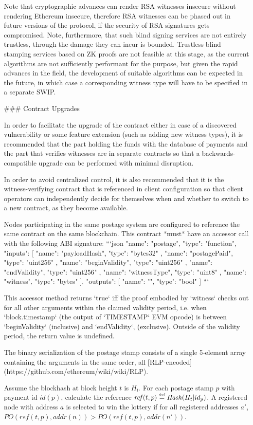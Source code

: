 Note that cryptographic advances can render RSA witnesses insecure without rendering Ethereum insecure, therefore RSA witnesses can be phased out in future versions of the protocol, if the security of RSA signatures gets compromised. Note, furthermore, that such blind signing services are not entirely trustless, through the damage they can incur is bounded. Trustless blind stamping services based on ZK proofs are not feasible at this stage, as the current algorithms are not sufficiently performant for the purpose, but given the rapid advances in the field, the development of suitable algorithms can be expected in the future, in which case a corresponding witness type will have to be specified in a separate SWIP.

### Contract Upgrades

In order to facilitate the upgrade of the contract either in case of a discovered vulnerability or some feature extension (such as adding new witness types), it is recommended that the part holding the funds with the database of payments and the part that verifies witnesses are in separate contracts so that a backwards-compatible upgrade can be performed with minimal disruption.

In order to avoid centralized control, it is also recommended that it is the witness-verifying contract that is referenced in client configuration so that client operators can independently decide for themselves when and whether to switch to a new contract, as they become available.


Nodes participating in the same postage system are configured to reference the same contract on the same blockchain. This contract
*must* have an accessor call with the following ABI signature:
```json
{
  "name": "postage",
  "type": "function",
  "inputs": [
    {
      "name": "payloadHash",
      "type": "bytes32"
    },
    {
      "name": "postagePaid",
      "type": "uint256"
    },
    {
      "name": "beginValidity",
      "type": "uint256"
    },
    {
      "name": "endValidity",
      "type": "uint256"
    },
    {
      "name": "witnessType",
      "type": "uint8"
    },
    {
      "name": "witness",
      "type": "bytes"
    }
  ],
  "outputs": [
    {
      "name": "",
      "type": "bool"
    }
  ]
}
```

This accessor method returns `true` iff the proof embodied by `witness` checks out for all other arguments within the claimed 
validity period, i.e. when `block.timestamp` (the output of `TIMESTAMP` EVM opcode) is between `beginValidity` (inclusive) and 
`endValidity`, (exclusive). Outside of the validity period, the return value is undefined.

The binary serialization of the postage stamp consists of a single 5-element array containing the arguments in the same order, all [RLP-encoded](https://github.com/ethereum/wiki/wiki/RLP). 


Assume the blockhash at block height $t$ is $H_t$. For each postage stamp $p$ with payment id $\mathit{id}(p)$, calculate the reference $\mathit{ref}(t, p)\overset{\textrm{\tiny def}}{=} \mathit{Hash}(H_t|id_p)$. A registered node with address $a$ is selected to win the lottery if for all registered addresses $a'$,  $\mathit{PO}(\mathit{ref}(t, p), \mathit{addr}(n))
>\mathit{PO}(\mathit{ref}(t, p), \mathit{addr}(n'))$.